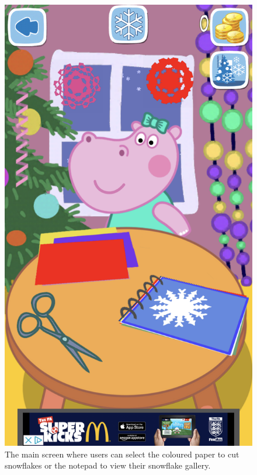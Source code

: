 \documentclass[11pt]{article}
\begin{document}
\begin{figure}[!ht]
\begin{minipage}{0.32\textwidth}
                            \includegraphics[width=0.8\linewidth]{Images/peppa/peppaMain.PNG}
                             \caption{The main screen where users can select the coloured paper to cut snowflakes or the notepad to view their snowflake gallery.\\}
                            \label{fig:peppaMain}
                        \end{minipage}
                        \begin{minipage}{0.32\textwidth}
                            \centering

\end{minipage}
\end{figure}
\end{document}
